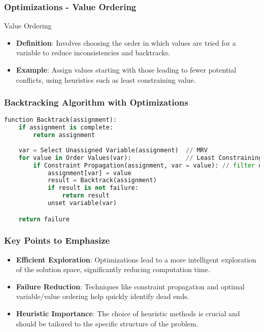 \documentclass[aspectratio=169]{beamer}
\begin{document}
\begin{frame}[fragile]
    \frametitle{Optimizations - Value Ordering}
    \begin{block}{Value Ordering}
        \begin{itemize}
            \item \textbf{Definition}: Involves choosing the order in which values are tried for a variable to reduce inconsistencies and backtracks.
            \item \textbf{Example}: Assign values starting with those leading to fewer potential conflicts, using heuristics such as least constraining value.
        \end{itemize}
    \end{block}
\end{frame}

\begin{frame}[fragile]
    \frametitle{Backtracking Algorithm with Optimizations}
    \begin{lstlisting}[language=Python]
function Backtrack(assignment):
    if assignment is complete:
        return assignment
    
    var = Select Unassigned Variable(assignment)  // MRV
    for value in Order Values(var):               // Least Constraining Value
        if Constraint Propagation(assignment, var = value): // filter domain
            assignment[var] = value
            result = Backtrack(assignment)
            if result is not failure:
                return result
            unset variable(var)

    return failure
    \end{lstlisting}
\end{frame}

\begin{frame}[fragile]
    \frametitle{Key Points to Emphasize}
    \begin{itemize}
        \item \textbf{Efficient Exploration}: Optimizations lead to a more intelligent exploration of the solution space, significantly reducing computation time.
        \item \textbf{Failure Reduction}: Techniques like constraint propagation and optimal variable/value ordering help quickly identify dead ends.
        \item \textbf{Heuristic Importance}: The choice of heuristic methods is crucial and should be tailored to the specific structure of the problem.
    \end{itemize}
\end{frame}
\end{document}
